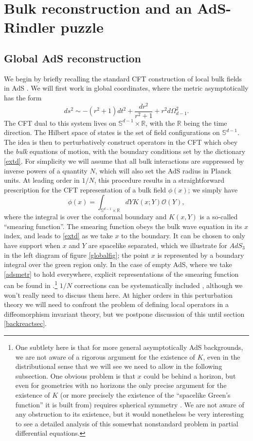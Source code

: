 \documentclass[11pt]{article}
\newcommand{\be}{\begin{equation}}
\newcommand{\ee}{\end{equation}}
\begin{document}
\section{Bulk reconstruction and an AdS-Rindler puzzle}
\subsection{Global AdS reconstruction}\label{globalsec}
We begin by briefly recalling the standard CFT construction of local bulk fields in AdS \cite{Banks:1998dd,Hamilton:2006az,Heemskerk:2012mn}.  We will first work in global coordinates, where the metric asymptotically has the form
\be\label{adsmetr}
ds^2\sim-(r^2+1)dt^2+\frac{dr^2}{r^2+1}+r^2 d\Omega_{d-1}^2.
\ee
The CFT dual to this system lives on $\mathbb{S}^{d-1}\times \mathbb{R}$, with the $\mathbb{R}$ being the time direction.  The Hilbert space of states is the set of field configurations on $\mathbb{S}^{d-1}$.  The idea is then to perturbatively construct operators in the CFT which obey the \textit{bulk} equations of motion, with the boundary conditions set by the dictionary \eqref{extd}.  For simplicity we will assume that all bulk interactions are suppressed by inverse powers of a quantity $N$, which will also set the AdS radius in Planck units. At leading order in $1/N$, this procedure results in a straightforward prescription for the CFT representation of a bulk field $\phi(x)$; we simply have
\be\label{smear}
\phi(x)=\int_{\mathbb{S}^{d-1}\times \mathbb{R}} dY K(x;Y)\mathcal{O}(Y),
\ee
where the integral is over the conformal boundary and $K(x,Y)$ is a so-called ``smearing function''.  The smearing function obeys the bulk wave equation in its $x$ index, and leads to \eqref{extd} as we take $x$ to the boundary.  It can be chosen to only have support when $x$ and $Y$ are spacelike separated, which we illustrate for $AdS_3$ in the left diagram of figure \ref{globalfig}; the point $x$ is represented by a boundary integral over the green region only.  In the case of empty AdS, where we take \eqref{adsmetr} to hold everywhere, explicit representations of the smearing function can be found in \cite{Hamilton:2006az,Heemskerk:2012mn}.\footnote{One subtlety here is that for more general asymptotically AdS backgrounds, we are not aware of a rigorous argument for the existence of $K$, even in the distributional sense that we will see we need to allow in the following subsection.  One obvious problem is that $x$ could be behind a horizon, but even for geometries with no horizons the only precise argument for the existence of $K$ (or more precisely the existence of the ``spacelike Green's function'' it is built from) requires spherical symmetry \cite{Heemskerk:2012mn}.  We are not aware of any obstruction to its existence, but it would nonetheless be very interesting to see a detailed analysis of this somewhat nonstandard problem in partial differential equations.}  $1/N$ corrections can be systematically included \cite{Kabat:2011rz,Heemskerk:2012mn}, although we won't really need to discuss them here.  At higher orders in this perturbation theory we will need to confront the problem of defining local operators in a diffeomorphism invariant theory, but we postpone discussion of this until section \ref{backreactsec}.  
\end{document}
